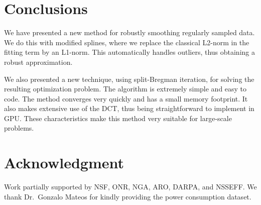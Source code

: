 \documentclass[preprint]{imsart}
\begin{document}
\section{Conclusions}
\label{sec:conclusions}

We have presented a new method for robustly smoothing regularly sampled data. We do this with modified splines, where we replace the classical L2-norm in the fitting term by an L1-norm. This automatically handles outliers, thus obtaining a robust approximation.

We also presented a new technique, using split-Bregman iteration, for solving the resulting optimization problem. The algorithm is extremely simple and easy to code. The method converges very quickly and has a small memory footprint. It also makes extensive use of the DCT, thus being straightforward to implement in GPU. These characteristics make this method very suitable for large-scale problems.

\section*{Acknowledgment}

Work partially supported by NSF, ONR, NGA, ARO, DARPA, and NSSEFF.
We thank Dr.~Gonzalo Mateos for kindly providing the power consumption dataset.



\end{document}
